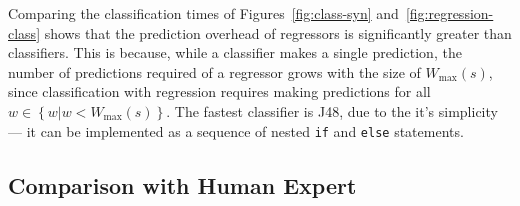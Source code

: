 \documentclass{acaces}
\begin{document}
Comparing the classification times of Figures~\ref{fig:class-syn}
and~\ref{fig:regression-class} shows that the prediction overhead of
regressors is significantly greater than classifiers. This is because,
while a classifier makes a single prediction, the number of
predictions required of a regressor grows with the size of
$W_{\max}(s)$, since classification with regression requires making
predictions for all $w \in \left\{ w | w < W_{\max}(s) \right\}$. The
fastest classifier is J48, due to the it's simplicity --- it can be
implemented as a sequence of nested \texttt{if} and \texttt{else}
statements.




\subsection{Comparison with Human Expert}
\end{document}

